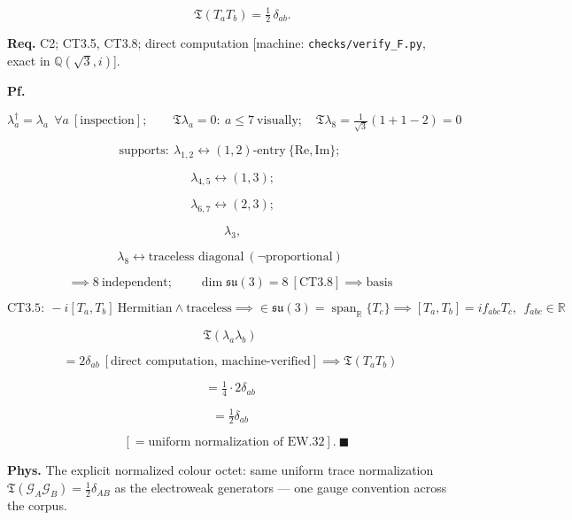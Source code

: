\begin{theorem}
\[
\qquad \mathfrak T(T_aT_b)=\tfrac12\,\delta_{ab}.
\]

\textbf{Req.} C2; CT3.5, CT3.8; direct computation [machine: \texttt{checks/\allowbreak{}verify\_\allowbreak{}F.py}, exact in $\mathbb Q(\sqrt3,i)$].

\textbf{Pf.}

\[
\lambda_a^\dagger=\lambda_a\ \ \forall a\ [\text{inspection}];\qquad
\mathfrak T\lambda_a=0:\ a\le7\ \text{visually};\quad\mathfrak T\lambda_8=\tfrac1{\sqrt3}(1+1-2)=0
\]

\[
\text{supports}:\ \lambda_{1,2}\leftrightarrow(1,2)\text{-entry}\ \{\mathrm{Re},\mathrm{Im}\};
\]

\[
\ \ \lambda_{4,5}\leftrightarrow(1,3);
\]

\[
\ \ \lambda_{6,7}\leftrightarrow(2,3);
\]

\[
\ \ \lambda_{3},
\]

\[
\lambda_{8}\leftrightarrow\text{traceless diagonal}\ (\neg\text{proportional})
\]

\[
\implies8\ \text{independent};\qquad\dim\mathfrak{su}(3)=8\ [\mathrm{CT3.8}]\implies\text{basis}
\]

\[
\mathrm{CT3.5}:\ -i[T_a,T_b]\ \text{Hermitian}\wedge\text{traceless}\implies\in\mathfrak{su}(3)=\operatorname{span}_{\mathbb R}\{T_c\}\implies[T_a,T_b]=if_{abc}T_c,\ \ f_{abc}\in\mathbb R
\]

\[
\mathfrak T(\lambda_a\lambda_b)
\]

\[
= 2\delta_{ab}\ [\text{direct computation, machine-verified}]\implies\mathfrak T(T_aT_b)
\]

\[
= \tfrac14\cdot2\delta_{ab}
\]

\[
= \tfrac12\delta_{ab}
\]

\[
\quad [=\text{uniform normalization of EW.32}].\ \blacksquare
\]

\textbf{Phys.} The explicit normalized colour octet: same uniform trace normalization $\mathfrak T(\mathcal G_A\mathcal G_B)=\tfrac12\delta_{AB}$ as the electroweak generators — one gauge convention across the corpus.

\end{theorem}

